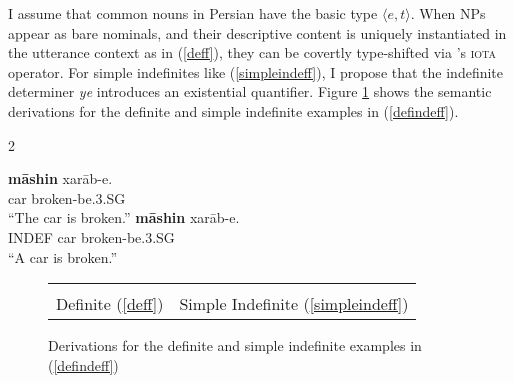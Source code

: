 \documentclass{salt}
\begin{document}
I assume that common nouns in Persian have the basic type $\langle e, t\rangle$. When NPs appear as bare nominals, and their descriptive content is uniquely instantiated in the utterance context as in (\ref{deff}), they can be covertly type-shifted via \cite{partee1987noun}'s \textsc{iota} operator. For simple indefinites like (\ref{simpleindeff}), I propose that the indefinite determiner \emph{ye} introduces an existential quantifier. Figure \ref{simpletrees} shows the semantic derivations for the definite and simple indefinite examples in (\ref{defindeff}).

\begin {multicols} {2}
	\begin {exe}
	\ex \label {defindeff} \begin {xlist} 
	\ex \label{deff}
		\gll	\textbf{m\={a}shin} xar\={a}b-e.\\
			car broken-be{\scriptsize .3.SG}\\
			``The car is broken.''			
	\ex\label{simpleindeff}
			 \textbf{m\={a}shin}	xar\={a}b-e.\\
			{\scriptsize INDEF} car 	broken-be{\scriptsize .3.SG}\\
			``A car is broken.''
	\end {xlist}
	\end {exe}
\end {multicols}

\begin {figure}
\centering
\begin {tabular} {c | c}
{\small
	\begin{tikzpicture}[level distance=35pt]
	\Tree [.{\footnotesize$\underset{t}{\footnotesize\textsc{is-broken} (\iota x [ \textsc{car}(x)])}$}
				[.{\footnotesize $\underset{e}{\iota x [\textsc{car}}(x)]$} \edge node[auto=left] {\tiny \textsc{iota}}; [.{$\underset{et}{\footnotesize\textsc{car}}$} [.\emph{m\={a}shin} ] ] ]
        		[.{$\footnotesize \underset{et}{\lambda y [\textsc{is-broken} (y)]}$} [.\emph{xar\={a}b-e} ]
        		]
			]
	\end{tikzpicture}	
} & {\small
	\begin{tikzpicture}[level distance=35pt]
	\Tree [.{$\underset{t}{\footnotesize \exists x [\textsc{car}(x) \land \textsc{is-broken} (x)]}$}
				[.{$\underset{\langle et,t\rangle}{\footnotesize\lambda Q [\exists x [\textsc{car}(x) \land Q (x)]]}$}
			[.{$\underset{\langle et, \langle et,t\rangle \rangle}{\footnotesize \lambda P \lambda Q [\exists x [P(x) \land Q (x)]]}$} [.\emph{ye} ] ]
    		[.{$\underset{et}{\footnotesize \textsc{car}}$} [.\emph{m\={a}shin} ] ]
    			]
        		[.{$\underset{et}{\footnotesize\textsc{is-broken}}$} [.\emph{xar\={a}b-e} ]
        		]
			]
	\end{tikzpicture}	
} \\
{\small Definite} (\ref{deff}) & {\small Simple Indefinite (\ref{simpleindeff})} \\
\end {tabular}
\caption {\small Derivations for the definite and simple indefinite examples in (\ref{defindeff})}
\label {simpletrees}
\end {figure}
\end{document}
